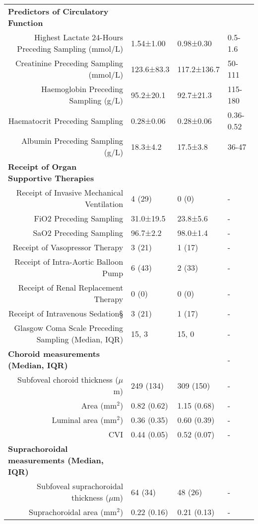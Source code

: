 {\begin{tabular}{rlll}
\multicolumn{1}{l}{\textbf{Predictors of Circulatory Function}} &  &  &  \\
Highest Lactate 24-Hours Preceding Sampling (mmol/L) & 1.54±1.00 & 0.98±0.30 & 0.5-1.6 \\
Creatinine Preceding Sampling (mmol/L) & 123.6±83.3 & 117.2±136.7 & 50-111 \\
Haemoglobin Preceding Sampling (g/L) & 95.2±20.1 & 92.7±21.3 & 115-180 \\
Haematocrit Preceding Sampling & 0.28±0.06 & 0.28±0.06 & 0.36-0.52 \\
Albumin Preceding Sampling (g/L) & 18.3±4.2 & 17.5±3.8 & 36-47 \\
\multicolumn{1}{l}{\textbf{Receipt of Organ Supportive Therapies}} &  &  &  \\
Receipt of Invasive Mechanical Ventilation & 4 (29) & 0 (0) & - \\
FiO2 Preceding Sampling & 31.0±19.5 & 23.8±5.6 & - \\
SaO2 Preceding Sampling & 96.7±2.2 & 98.0±1.4 & - \\
Receipt of Vasopressor Therapy & 3 (21) & 1 (17) & - \\
Receipt of Intra-Aortic Balloon Pump & 6 (43) & 2 (33) & - \\
Receipt of Renal Replacement Therapy & 0 (0) & 0 (0) & - \\
Receipt of Intravenous Sedation§ & 3 (21) & 1 (17) & - \\
Glasgow Coma Scale Preceding Sampling (Median, IQR) & 15, 3 & 15, 0 & - \\
\multicolumn{1}{l}{\textbf{Choroid measurements (Median, IQR)}} &  &  & - \\
Subfoveal choroid thickness ($\mu$m) & 249 (134) & 309 (150) & - \\
Area (mm$^2$) & 0.82 (0.62) & 1.15 (0.68) & - \\
Luminal area (mm$^2$) & 0.36 (0.35) & 0.60 (0.39) & - \\
\acrshort{CVI} & 0.44 (0.05) & 0.52 (0.07) & - \\
\multicolumn{1}{l}{\textbf{Suprachoroidal measurements (Median, IQR)}} &  &  &  \\
Subfoveal suprachoroidal thickness ($\mu$m) & 64 (34) & 48 (26) & - \\
Suprachoroidal area (mm$^2$) & 0.22 (0.16) & 0.21 (0.13) & - \\ 
\bottomrule
\end{tabular}
}
